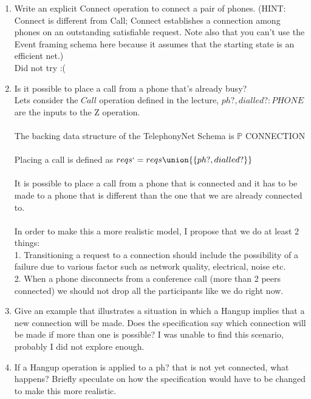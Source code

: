 \documentclass{article}
\begin{document}
\begin{enumerate}
\begin{enumerate}
\item Write an explicit Connect operation to connect a pair of
phones. (HINT: Connect is different from Call; Connect establishes
a connection among phones on an outstanding satisfiable request. Note also that you can't use the Event framing schema here because it assumes that the starting state is an efficient net.) \\
\color{blue}
Did not try :(
\color{black}
\item Is it possible to place a call from a phone that's already
  busy?
  \color{blue}
  \\
  Lets consider the $Call$ operation defined in the lecture, $ph?, dialled? : PHONE$ are the inputs to the Z operation. \\
  \\
  The backing data structure of the TelephonyNet Schema is $\mathbb{P}$ CONNECTION \\
  \\
  Placing a call is defined as $reqs`= reqs \union \{\{ ph?,dialled? \}\} $ \\
  \\
  It is possible to place a call from a phone that is connected and it has to be made to a phone that is different than the one that we are already connected to. \\
  \\
  In order to make this a more realistic model, I propose that we do at least 2 things: \\
  1. Transitioning a request to a connection should include the possibility of a failure due to various factor such as network quality, electrical, noise etc. \\
  2. When a phone disconnects from a conference call (more than 2 peers connected) we should not drop all the participants like we do right now. \\
  \color{black}
\item Give an example that illustrates a situation in which a
Hangup implies that a new connection will be made. Does the
specification say which connection will be made if more than one
is possible?
\color{blue}
I was unable to find this scenario, probably I did not explore enough. \\
\color{black}
\item If a Hangup operation is applied to a ph? that is not yet
connected, what happens? Briefly speculate on how the
specification would have to be changed to make this more
realistic.
\color{blue}
\\

\end{enumerate}
\end{enumerate}
\end{document}

